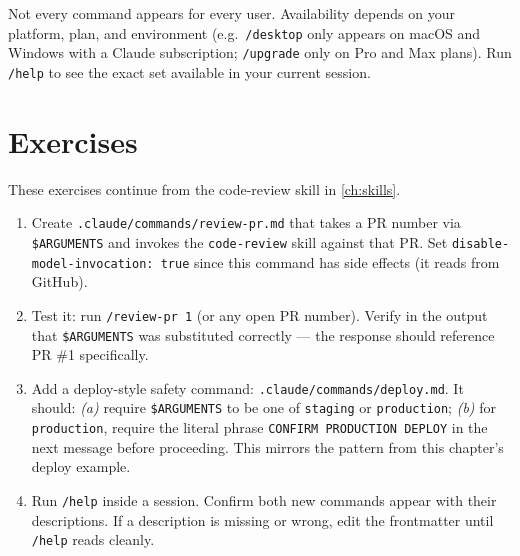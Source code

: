 \begin{notebox}
Not every command appears for every user. Availability depends on your
platform, plan, and environment (e.g.\ \texttt{/desktop} only appears on
macOS and Windows with a Claude subscription; \texttt{/upgrade} only on
Pro and Max plans). Run \texttt{/help} to see the exact set available in
your current session.
\end{notebox}

\section{Exercises}
\label{sec:command-exercises}

\begin{exercisebox}
These exercises continue from the code-review skill in
\cref{ch:skills}.

\begin{enumerate}
  \item Create \texttt{.claude/commands/review-pr.md} that takes a PR
        number via \texttt{\$ARGUMENTS} and invokes the
        \texttt{code-review} skill against that PR. Set
        \texttt{disable-model-invocation: true} since this command has
        side effects (it reads from GitHub).
  \item Test it: run \texttt{/review-pr 1} (or any open PR number).
        Verify in the output that \texttt{\$ARGUMENTS} was substituted
        correctly — the response should reference PR \#1 specifically.
  \item Add a deploy-style safety command:
        \texttt{.claude/commands/deploy.md}. It should:
        \emph{(a)} require \texttt{\$ARGUMENTS} to be one of
        \texttt{staging} or \texttt{production}; \emph{(b)} for
        \texttt{production}, require the literal phrase
        \texttt{CONFIRM PRODUCTION DEPLOY} in the next message before
        proceeding. This mirrors the pattern from this chapter's
        deploy example.
  \item Run \texttt{/help} inside a session. Confirm both new commands
        appear with their descriptions. If a description is missing or
        wrong, edit the frontmatter until \texttt{/help} reads cleanly.
\end{enumerate}
\end{exercisebox}

